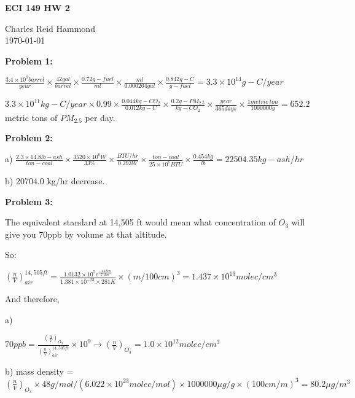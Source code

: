 \documentclass[10pt]{article}
\begin{document}
    \begin{center} 
        \large\textbf{ECI 149 HW 2}

        \normalsize Charles Reid Hammond \\ \today

    \end{center} 

    \setlength{\parskip}{\baselineskip}

    \begin{flushleft}

        \textbf{Problem 1:} 
        
        $\frac{3.4\times 10^9 barrel}{year} \times \frac{42 gal}{barrel} \times \frac{0.72 g-fuel}{ml}\times \frac{ml}{0.000264 gal}\times \frac{0.842 g-C}{g-fuel}=3.3\times 10^{14}g-C /year$

       $3.3\times 10^{11}kg-C /year \times 0.99 \times \frac{0.044kg-CO_2}{0.012kg-C}\times \frac{0.2 g-PM_{2.5}}{kg-CO_2}\times \frac{year}{365 days} \times \frac{1 metric\:ton}{1000000 g} = 652.2$ metric tons of $PM_{2.5}$ per day.


        \hrulefill


        \textbf{Problem 2:}

        a) $\frac{2.3\times 14.8 lb-ash}{ton-coal}\times \frac{3520\times 10^6 W}{33\%}\times \frac{BTU/hr}{0.293 W} \times \frac{ton-coal}{25\times 10^6 BTU} \times \frac{0.454 kg}{lb} = 22504.35 kg-ash/hr$

        b) 20704.0 kg/hr decrease.

        \hrulefill


        \textbf{Problem 3:}

        The equivalent standard at 14,505 ft would mean what concentration of $O_3$ will give you 70ppb by volume at that altitude.

        So:

        $\left(\frac{n}{V}\right)_{air}^{14,505ft}=\frac{1.0132\times 10^5 e^{\frac{-4.42km}{7.4km}}}{1.381\times 10^{-23}\times 281 K}\times (m/100cm)^3=1.437\times10^{19} molec/cm^3$

        And therefore,

        a)

        $70ppb=\frac{\left(\frac{n}{V}\right)_{O_3}}{\left(\frac{n}{V}\right)_{air}^{14,505ft}}\times 10^9\rightarrow \left(\frac{n}{V}\right)_{O_3} =1.0\times 10^{12} molec/cm^3 $

        b) mass density = $\left(\frac{n}{V}\right)_{O_3}\times 48 g/mol /\left(6.022\times 10^{23} molec/mol\right)\times 1000000 \mu g / g \times (100cm/m)^3 = 80.2 \mu g/m^3$


\end{flushleft}
\end{document}
